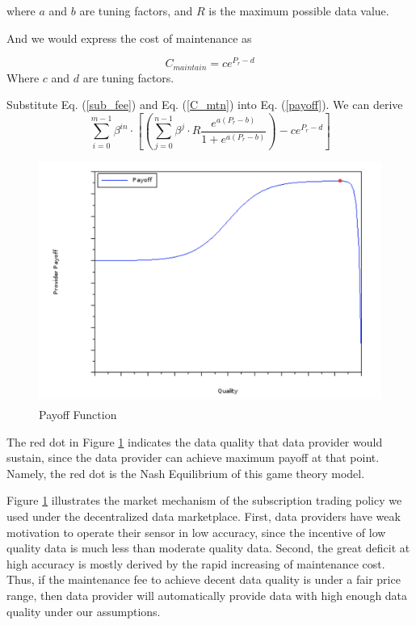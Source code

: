 \documentclass[journal,article,applsci,submit,moreauthors,pdftex]{Definitions/mdpi}
\begin{document}
where $a$ and $b$ are tuning factors, and $R$ is the maximum possible data value.

And we would express the cost of maintenance as

\begin{equation} \label{C_mtn}
    C_{maintain} = ce^{P_r - d}
\end{equation}
Where $c$ and $d$ are tuning factors.

Substitute Eq. (\ref{sub_fee}) and Eq. (\ref{C_mtn}) into Eq. (\ref{payoff}). We can derive
\begin{equation} \label{payoff_Pr}
    \sum_{i=0}^{m - 1}{\beta^{in}\cdot [(\sum_{j=0}^{n - 1} \beta^j \cdot R \frac{e^{a (P_r - b)}}{1 + e^{a (P_r - b)}}) - ce^{P_r - d}]}
\end{equation}

\begin{figure}[H] \centering \includegraphics[width=3.3 in]{payoff_pic} \caption{Payoff Function}
    \label{fig:payoff_pic} \end{figure}

The red dot in Figure \ref{fig:payoff_pic} indicates the data quality that data provider would sustain, since the data provider can achieve maximum payoff at that point. Namely, the red dot is the Nash Equilibrium of this game theory model.

Figure \ref{fig:payoff_pic} illustrates the market mechanism of the subscription trading policy we used under the decentralized data marketplace. First, data providers have weak motivation to operate their sensor in low accuracy, since the incentive of low quality data is much less than moderate quality data. Second, the great deficit at high accuracy is mostly derived by the rapid increasing of maintenance cost. Thus, if the maintenance fee to achieve decent data quality is under a fair price range, then data provider will automatically provide data with high enough data quality under our assumptions.
\end{document}
